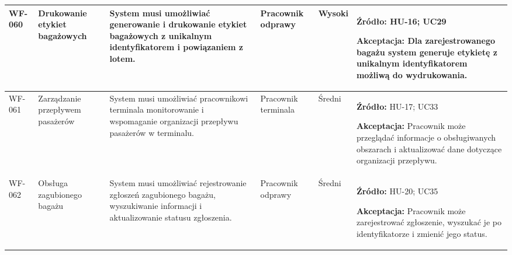 \documentclass[12pt,a4paper,oneside]{report}
\begin{document}
\begin{longtable}{|p{1.05cm}|p{2.15cm}|p{3.35cm}|p{1.75cm}|p{0.95cm}|p{4.05cm}|}
WF-060 & Drukowanie etykiet bagażowych & System musi umożliwiać generowanie i drukowanie etykiet bagażowych z unikalnym identyfikatorem i powiązaniem z lotem. & Pracownik odprawy & Wysoki & \textbf{Źródło:} HU-16; UC29\par\textbf{Akceptacja:} Dla zarejestrowanego bagażu system generuje etykietę z unikalnym identyfikatorem możliwą do wydrukowania.\\\hline
WF-061 & Zarządzanie przepływem pasażerów & System musi umożliwiać pracownikowi terminala monitorowanie i wspomaganie organizacji przepływu pasażerów w terminalu. & Pracownik terminala & Średni & \textbf{Źródło:} HU-17; UC33\par\textbf{Akceptacja:} Pracownik może przeglądać informacje o obsługiwanych obszarach i aktualizować dane dotyczące organizacji przepływu.\\\hline
WF-062 & Obsługa zagubionego bagażu & System musi umożliwiać rejestrowanie zgłoszeń zagubionego bagażu, wyszukiwanie informacji i aktualizowanie statusu zgłoszenia. & Pracownik odprawy & Średni & \textbf{Źródło:} HU-20; UC35\par\textbf{Akceptacja:} Pracownik może zarejestrować zgłoszenie, wyszukać je po identyfikatorze i zmienić jego status.\\\hline
\end{longtable}
\normalsize
\end{document}
